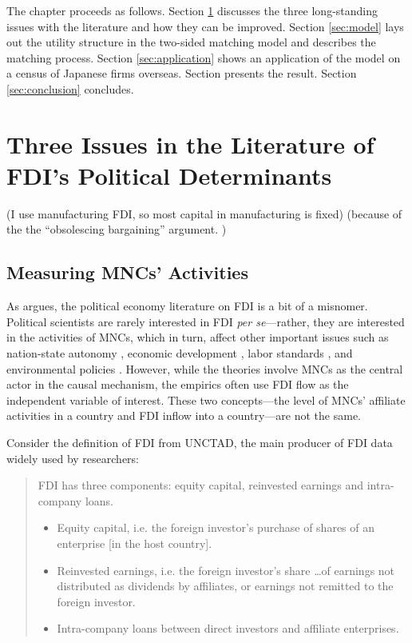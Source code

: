 The chapter proceeds as follows. Section \ref{sec:literature_issues} discusses the
three long-standing issues with the literature and how they can be improved.
Section \ref{sec:model} lays out the utility structure in the two-sided matching
model and describes the matching process. Section \ref{sec:application} shows an
application of the model on a census of Japanese firms overseas. Section
presents the result. Section \ref{sec:conclusion} concludes.

\section{Three Issues in the Literature of FDI's Political Determinants}
\label{sec:literature_issues}

(I use manufacturing FDI, so most capital in manufacturing is fixed) (because of
the the ``obsolescing bargaining'' argument. )


\subsection{Measuring MNCs' Activities}

As \citet{Kerner2004} argues, the political economy literature on FDI is a bit
of a misnomer. Political scientists are rarely interested in FDI \textit{per
se}---rather, they are interested in the activities of MNCs, which in turn,
affect other important issues such as nation-state autonomy \citep{Mosley2005},
economic development \citep{Moran1998}, labor standards \citep{Mosley2007}, and
environmental policies \citep{Prakash2007}. However, while the theories involve
MNCs as the central actor in the causal mechanism, the empirics often use FDI
flow as the independent variable of interest. These two concepts---the level of
MNCs' affiliate activities in a country and FDI inflow into a country---are not
the same.

Consider the definition of FDI from UNCTAD, the main producer of FDI data widely
used by researchers:

\begin{quote} FDI has three components: equity capital, reinvested earnings and
intra-company loans.
\begin{itemize}
\item Equity capital, i.e. the foreign investor’s purchase of shares of an
enterprise [in the host country].
\item Reinvested earnings, i.e. the foreign investor’s share \ldots of earnings
not distributed as dividends by affiliates, or earnings not remitted to the
foreign investor.
  \item Intra-company loans between direct investors and affiliate enterprises.
\end{itemize} \citep[245]{UNCTAD2007}
\end{quote}

